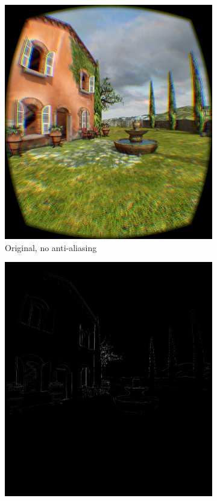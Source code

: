 \documentclass[12pt,a4paper,twoside,openright]{report}
\begin{document}
\begin{figure}[tbh]

\begin{subfigure}{0.5\textwidth}
\includegraphics[width=1.0\linewidth]{figs/noantialiasing.png}
\caption{Original, no anti-aliasing}
\end{subfigure}
\begin{subfigure}{0.5\textwidth}
\includegraphics[width=1.0\linewidth]{figs/fullscreenminusnothing.png} 

\end{subfigure}
\end{figure}
\end{document}
